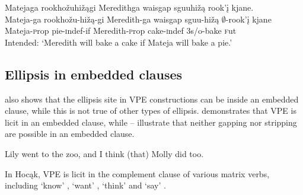 \documentclass[output=paper]{LSP/langsci}
\begin{document}
\ea\label{ex:johnson:36}
\ea\label{ex:johnson:36a}
\glll Matejaga rookhožuhižągi Meredithga {waisgap sguuhižą} rook'į kjane.\\
Mateja-ga rookhožu-hižą-gi Meredith-ga {waisgap sguu-hižą} $\emptyset$-rook'į kjane\\
Mateja-{\textsc prop} pie-{\textsc indef}-if Meredith-{\textsc prop} cake-{\textsc indef} {\textsc 3s/o}-bake {\textsc fut}\\
\trans Intended: `Meredith will bake a cake if Mateja will bake a pie.'	
\label{ex:johnson:36b}
\label{ex:johnson:36c}
\z
\z

\subsection{Ellipsis in embedded clauses}\label{sec:johnson:3.4}

\citet{Goldberg2005} also shows that the ellipsis site in VPE constructions can be inside an embedded clause, while this is not true of other types of ellipsis.  demonstrates that VPE is licit in an embedded clause, while -- illustrate that neither gapping nor stripping are possible in an embedded clause.

\ea\label{ex:johnson:37}
\ea\label{ex:johnson:37a}
Lily went to the zoo, and I think (that) Molly did too.
\label{ex:johnson:37b}
\label{ex:johnson:3c}
\z
\z

In Hocąk, VPE is licit in the complement clause of various matrix verbs, including `know' , `want' , `think'  and `say' .
\end{document}
